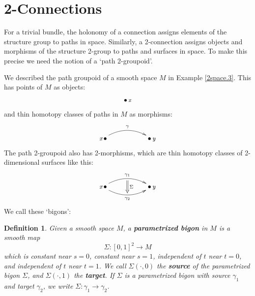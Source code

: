 \documentclass{article}
\newcommand{\maps}{\colon}
\newtheorem{definition}[theorem]{Definition}
\newcommand{\et}{\hspace{-0.08in}{\bf .}\hspace{0.1in}}
\def\of #1{\!\left({#1}\right)}
\begin{document}
\section{2-Connections}
\label{section: 2-Connections}

For a trivial bundle, 
the holonomy of a connection assigns elements of the structure
group to paths in space.  Similarly, a 2-connection
assigns objects and morphisms of the structure 2-group to 
paths and surfaces in space.  To make this precise we need 
the notion of a `path 2-groupoid'.  

We described the path groupoid of a smooth space $M$
in Example \ref{2space.3}.  This has points of $M$ as
objects:
\[    \bullet \, {\textstyle{\small{\textit{x}}}}  \]
and thin homotopy classes of paths in $M$ as morphisms:
\[
\xymatrix{
 {\textstyle{\small{\textit{x}}}}  \,
   \bullet \ar@/^1pc/[rr]^{\gamma}
&& \bullet \, {\textstyle{\small{\textit{y}}}}   
}
\]
The path 2-groupoid also has 2-morphisms, which are
thin homotopy classes of 2-dimensional surfaces like this: 
\[
\xymatrix{
 {\textstyle{\small{\textit{x}}}} \, 
   \bullet \ar@/^1pc/[rr]^{\gamma_1}_{}="0"
           \ar@/_1pc/[rr]_{\gamma_2}^{}="1"
&& \bullet \, {\textstyle{\small{\textit{y}}}}   
\ar@{=>}"0";"1"^{\Sigma}
}
\]
We call these `bigons':

\begin{definition} \et 
\label{parametrized bigon}
  Given a smooth space $M$, a {\bf parametrized bigon} in $M$
  is a smooth map
  \[
    \Sigma \maps [0,1]^2 \to M
  \]
  which is constant near $s = 0$, constant near $s = 1$, 
  independent of $t$ near $t = 0$, and independent of $t$ near $t = 1$.
  We call $\Sigma\of{\cdot,0}$ the {\bf source} of the 
  parametrized bigon $\Sigma$, and $\Sigma\of{\cdot,1}$ the 
  {\bf target}.  If $\Sigma$ is a parametrized bigon with
  source $\gamma_1$ and target $\gamma_2$, we write $\Sigma \maps
  \gamma_1 \to \gamma_2$.   
\end{definition}
\end{document}
